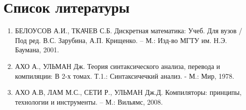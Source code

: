 	\section{Список литературы}
		\begin{enumerate}
			\item БЕЛОУСОВ А.И., ТКАЧЕВ С.Б. Дискретная математика: Учеб. Для вузов / Под ред. В.С. Зарубина, А.П. Крищенко. – М.: Изд-во МГТУ им. Н.Э. Баумана, 2001.
			\item АХО А., УЛЬМАН Дж. Теория синтаксического анализа, перевода и компиляции: В 2-х томах. Т.1.: Синтаксичечкий анализ. - М.: Мир, 1978.
			\item АХО А.В, ЛАМ М.С., СЕТИ Р., УЛЬМАН Дж.Д. Компиляторы: принципы, технологии и инструменты. – М.: Вильямс, 2008.
		\end{enumerate}
	